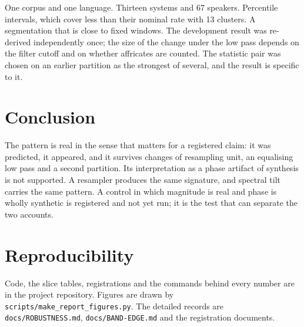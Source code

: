 \documentclass[11pt]{article}
\begin{document}
One corpus and one language. Thirteen systems and 67 speakers. Percentile
intervals, which cover less than their nominal rate with 13 clusters. A
segmentation that is close to fixed windows. The development result was
re-derived independently once; the size of the change under the low pass
depends on the filter cutoff and on whether affricates are counted. The statistic pair was
chosen on an earlier partition as the strongest of several, and the result is
specific to it.

\section{Conclusion}

The pattern is real in the sense that matters for a registered claim: it was
predicted, it appeared, and it survives changes of resampling unit, an
equalising low pass and a second partition. Its interpretation as a phase
artifact of synthesis is not supported. A resampler produces the same
signature, and spectral tilt carries the same pattern. A control in which
magnitude is real and phase is wholly synthetic is registered and not yet run;
it is the test that can separate the two accounts.

\section*{Reproducibility}

Code, the slice tables, registrations and the commands behind every number are
in the project repository. Figures are drawn by
\texttt{scripts/make\_report\_figures.py}. The detailed records are
\texttt{docs/ROBUSTNESS.md}, \texttt{docs/BAND-EDGE.md} and the registration
documents.


\end{document}
